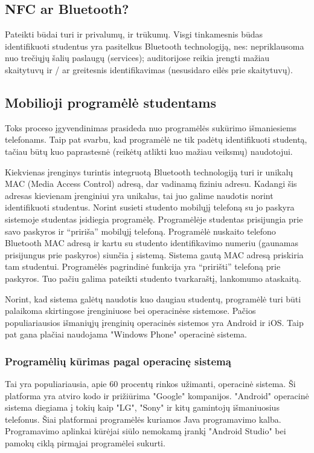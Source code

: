 \documentclass{VUMIFPSkursinis}
\begin{document}
\subsection{NFC ar Bluetooth?}
Pateikti būdai turi ir privalumų, ir trūkumų. Visgi tinkamesnis būdas identifikuoti studentus yra pasitelkus Bluetooth technologiją, nes: nepriklausoma nuo trečiųjų šalių paslaugų (services); auditorijose reikia įrengti mažiau skaitytuvų ir / ar greitesnis identifikavimas (nesusidaro eilės prie skaitytuvų).

\subsection{Mobilioji programėlė studentams}
Toks proceso įgyvendinimas prasideda nuo programėlės sukūrimo išmaniesiems telefonams. Taip pat svarbu, kad programėlė ne tik padėtų identifikuoti studentą, tačiau būtų kuo paprastesnė (reikėtų atlikti kuo mažiau veiksmų) naudotojui.

Kiekvienas įrenginys turintis integruotą Bluetooth technologiją turi ir unikalų MAC (Media Access Control) adresą, dar vadinamą fiziniu adresu. Kadangi šis adresas kievienam įrenginiui yra unikalus, tai juo galime naudotis norint identifikuoti studentus. Norint susieti studento mobilųjį telefoną su jo paskyra sistemoje studentas įsidiegia programėlę. Programėlėje studentas prisijungia prie savo paskyros ir “pririša” mobilųjį telefoną. Programėlė nuskaito telefono Bluetooth MAC adresą ir kartu su studento identifikavimo numeriu (gaunamas prisijungus prie paskyros) siunčia į sistemą. Sistema gautą MAC adresą priskiria tam studentui. Programėlės pagrindinė funkcija yra “pririšti” telefoną prie paskyros. Tuo pačiu galima pateikti studento tvarkaraštį, lankomumo ataskaitą.

Norint, kad sistema galėtų naudotis kuo daugiau studentų, programėlė turi būti palaikoma skirtingose įrenginiuose bei operacinėse sistemose. Pačios populiariausios išmaniųjų įrenginių operacinės sistemos yra Android ir iOS. Taip pat gana plačiai naudojama "Windows Phone" operacinė sistema.

\subsubsection{Programėlių kūrimas pagal operacinę sistemą}

Tai yra populiariausia, apie 60 procentų rinkos užimanti, operacinė sistema. Ši platforma yra atviro kodo ir prižiūrima "Google" kompanijos. "Android" operacinė sistema diegiama į tokių kaip "LG", "Sony" ir kitų gamintojų išmaniuosius telefonus. Šiai platformai programėlės kuriamos Java programavimo kalba. Programavimo aplinkai kūrėjai siūlo nemokamą įrankį "Android Studio" bei pamokų ciklą pirmąjai programėlei sukurti.
\end{document}
